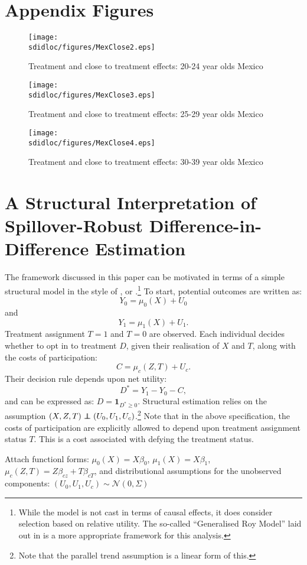 \clearpage

\section{Appendix Figures}
\label{Sscn:Agraphs}
\begin{figure}[htpb!]
\texttt{[image: \\sdidloc/figures/MexClose2.eps]}
\caption{Treatment and close to treatment effects: 20-24 year olds Mexico}
\end{figure}
\begin{figure}[htpb!]
\texttt{[image: \\sdidloc/figures/MexClose3.eps]}
\caption{Treatment and close to treatment effects: 25-29 year olds Mexico}
\end{figure}
\begin{figure}[htpb!]
\texttt{[image: \\sdidloc/figures/MexClose4.eps]}
\caption{Treatment and close to treatment effects: 30-39 year olds Mexico}
\end{figure}

\section{A Structural Interpretation of Spillover-Robust Difference-in-Difference Estimation}
The framework discussed in this paper can be motivated in terms of a simple
structural model in the style of \citet{Roy1951}, or 
\citet{HeckmanVytlacil2005}.\footnote{While the \citet{Roy1951} model is not
cast in terms of causal effects, it does consider selection based on relative
utility.  The so-called ``Generalised Roy Model'' laid out in 
\citet{HeckmanVytlacil2005} is a more appropriate framework for this analysis.}
To start, potential outcomes are written as:
\[
Y_0= \mu_0(X) + U_0
\]
and
\[
Y_1= \mu_1(X) + U_1.
\]
Treatment assignment $T=1$ and $T=0$ are observed.  Each individual decides
whether to opt in to treatment $D$, given their realisation of $X$ and $T$,
along with the costs of participation:
\[
C=\mu_c(Z,T)+U_c.
\]
Their decision rule depends upon net utility:
\[
D^{*}=Y_1-Y_0-C,
\]
and can be expressed as: $D=\mathbf{1}_{D^{*}\geq 0}$.  Structural estimation
relies on the assumption $(X,Z,T) \independent (U_0,U_1,U_c)$.\footnote{Note
that the parallel trend assumption is a linear form of this.}  Note that in 
the above specification, the costs of participation are explicitly allowed 
to depend upon treatment assignment status $T$. This is a cost associated with
defying the treatment status.

Attach functionl forms: $\mu_0(X)=X\beta_0$, $\mu_1(X)=X\beta_1$, 
$\mu_c(Z,T)=Z\beta_{cz}+T\beta_{cT}$, and distributional assumptions for the
unobserved components: $(U_0,U_1,U_c)\sim \mathcal{N}(0,\Sigma)$ 



%
